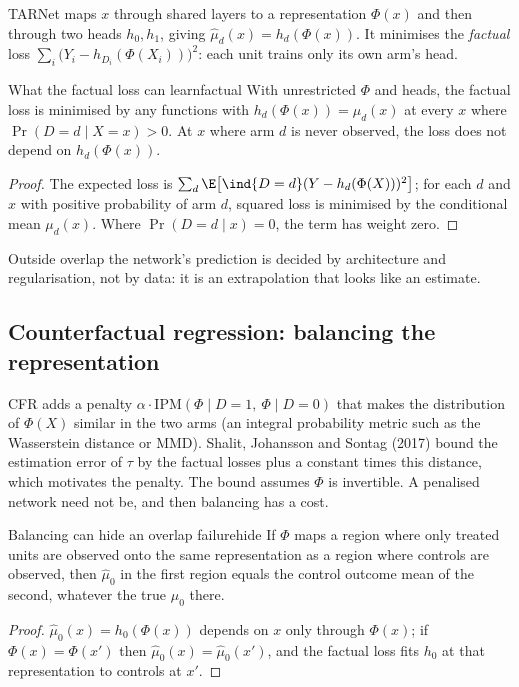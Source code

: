 \documentclass[11pt]{article}
\begin{document}
TARNet maps $x$ through shared layers to a representation $\Phi(x)$ and then through two heads $h_0, h_1$, giving
$\hat\mu_d(x) = h_d(\Phi(x))$. It minimises the \emph{factual} loss
$\sum_i \big(Y_i - h_{D_i}(\Phi(X_i))\big)^2$: each unit trains only its own arm's head.

\begin{prop}{What the factual loss can learn}{factual}
With unrestricted $\Phi$ and heads, the factual loss is minimised by any functions with $h_d(\Phi(x)) = \mu_d(x)$ at
every $x$ where $\Pr(D = d \mid X = x) > 0$. At $x$ where arm $d$ is never observed, the loss does not depend on
$h_d(\Phi(x))$.
\end{prop}
\begin{proof}
The expected loss is $\sum_d \E\big[\ind{D=d}(Y - h_d(\Phi(X)))^2\big]$; for each $d$ and $x$ with positive
probability of arm $d$, squared loss is minimised by the conditional mean $\mu_d(x)$. Where $\Pr(D=d \mid x) = 0$, the
term has weight zero.
\end{proof}

Outside overlap the network's prediction is decided by architecture and regularisation, not by data: it is an
extrapolation that looks like an estimate.

\subsection{Counterfactual regression: balancing the representation}

CFR adds a penalty $\alpha \cdot \text{IPM}(\Phi \mid D=1,\ \Phi \mid D=0)$ that makes the distribution of $\Phi(X)$ similar
in the two arms (an integral probability metric such as the Wasserstein distance or MMD). Shalit, Johansson and
Sontag (2017) bound the estimation error of $\tau$ by the factual losses plus a constant times this distance, which
motivates the penalty. The bound assumes $\Phi$ is invertible. A penalised network need not be, and then balancing has
a cost.

\begin{prop}{Balancing can hide an overlap failure}{hide}
If $\Phi$ maps a region where only treated units are observed onto the same representation as a region where
controls are observed, then $\hat\mu_0$ in the first region equals the control outcome mean of the second, whatever
the true $\mu_0$ there.
\end{prop}
\begin{proof}
$\hat\mu_0(x) = h_0(\Phi(x))$ depends on $x$ only through $\Phi(x)$; if $\Phi(x) = \Phi(x')$ then $\hat\mu_0(x) = \hat\mu_0(x')$, and
the factual loss fits $h_0$ at that representation to controls at $x'$.
\end{proof}
\end{document}
